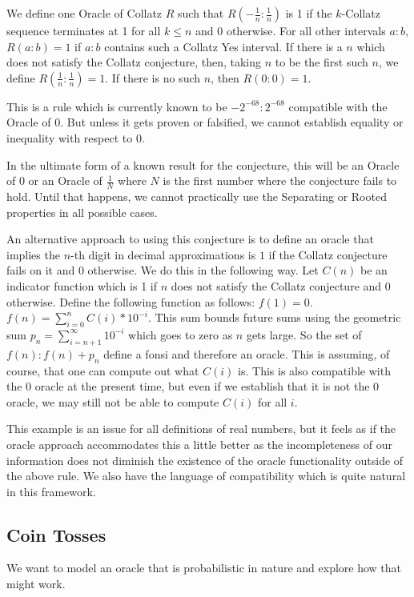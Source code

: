 \documentclass[12pt]{article}
\theoremstyle{remark}
\begin{document}
We define one Oracle of Collatz $R$ such that $R(-\tfrac{1}{n}:\tfrac{1}{n})$ is 1 if the $k$-Collatz sequence terminates at 1 for all $k \leq n$ and 0 otherwise. For all other intervals $a:b$, $R(a:b) = 1$ if $a:b$ contains such a Collatz Yes interval. If there is a $n$ which does not satisfy the Collatz conjecture, then, taking $n$ to be the first such $n$, we define $R(\tfrac{1}{n}:\tfrac{1}{n}) = 1$. If there is no such $n$, then $R(0:0) = 1$.

This is a rule which is currently known to be $-2^{-68}:2^{-68}$ compatible with the Oracle of 0. But unless it gets proven or falsified, we cannot establish equality or inequality with respect to 0. 

In the ultimate form of a known result for the conjecture, this will be an Oracle of 0 or an Oracle of $\tfrac{1}{N}$ where $N$ is the first number where the conjecture fails to hold. Until that happens, we cannot practically use the Separating or Rooted properties in all possible cases. 

An alternative approach to using this conjecture is to define an oracle that implies the $n$-th digit in decimal approximations is $1$ if the Collatz conjecture fails on it and $0$ otherwise. We do this in the following way. Let $C(n)$ be an indicator function which is 1 if $n$ does not satisfy the Collatz conjecture and 0 otherwise. Define the following function as follows: $f(1) = 0$. $f(n) = \sum_{i=0}^n C(i)*10^{-i} $. This sum bounds future sums using the geometric sum $p_n =\sum_{i=n+1}^{\infty} 10^{-i}$ which goes to zero as $n$ gets large. So the set of $f(n): f(n) + p_n $ define a fonsi and therefore an oracle. This is assuming, of course, that one can compute out what $C(i)$ is. This is also compatible with the 0 oracle at the present time, but even if we establish that it is not the 0 oracle, we may still not be able to compute $C(i)$ for all $i$. 

This example is an issue for all definitions of real numbers, but it feels as if the oracle approach accommodates this a little better as the incompleteness of our information does not diminish the existence of the oracle functionality outside of the above rule. We also have the language of compatibility which is quite natural in this framework. 

\subsection{Coin Tosses}

We want to model an oracle that is probabilistic in nature and explore how that might work. 
\end{document}

